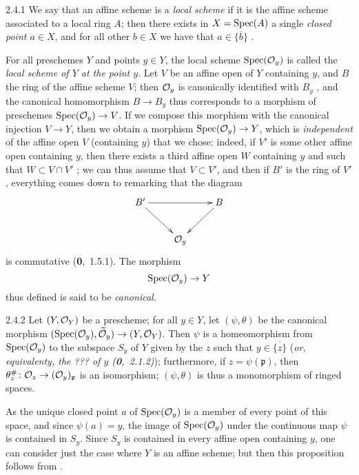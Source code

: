 
\begin{env}{2.4.1}
\label{env-1.2.4.1}
We say that an affine scheme is a \emph{local scheme} if
it is the affine scheme associated to a local ring $A$; then there exists in
$X=\operatorname{Spec}(A)$ a single \emph{closed point $a\in X$}, and for all other $b\in X$
we have that $a\in\overline{\{b\}}$ .
\end{env}
    
For all preschemes $Y$ and points $y\in Y$, the local scheme $\operatorname{Spec}(\mathcal{O}_y)$
is called the \emph{local scheme of $Y$ at the point $y$}. Let $V$ be an affine
open of $Y$ containing $y$, and $B$ the ring of the affine scheme $V$; then
$\mathcal{O}_y$ is canonically identified with $B_y$ , and the canonical
homomorphism $B\to B_y$ thus corresponds  to a morphism of preschemes
$\operatorname{Spec}(\mathcal{O}_y)\to V$.  If we compose this morphism with the canonical injection
$V\to Y$, then we obtain a morphism $\operatorname{Spec}(\mathcal{O}_y)\to Y$, which is
\emph{independent} of the affine open $V$ (containing $y$) that we chose:
indeed, if $V'$ is some other affine open containing $y$, then there exists a
third affine open $W$ containing $y$ and such that $W\subset V\cap V'$ ;
we can thus assume that $V\subset V'$, and then if $B'$ is the ring of $V'$,
everything comes down to remarking that the diagram
\[
  \xymatrix{
    B'\ar[rr]\ar[dr] & & B\ar[dl]\\
    & \O_y &
  }
\]
is commutative
(\textbf{0},~1.5.1). The morphism \[ \operatorname{Spec}(\mathcal{O}_y)\to Y \] thus defined is said
to be \emph{canonical}.
    
\begin{env}[Proposition]{2.4.2}
\label{prop-1.2.4.2}
Let $(Y,\mathcal{O}_Y)$ be a prescheme;
for all $y\in Y$, let $(\psi,\theta)$ be the canonical morphism
$(\operatorname{Spec}(\mathcal{O}_y),\widetilde{\mathcal{O}}_y)\to(Y,\mathcal{O}_Y)$. Then $\psi$ is a homeomorphism
from $\operatorname{Spec}(\mathcal{O}_y)$ to the subspace $S_y$ of $Y$ given by the $z$ such that
$y\in\overline{\{z\}}$ (\emph{or, equivalenty, the \emph{???} of $y$
(\textbf{0},~2.1.2)}); furthermore, if $z=\psi(\mathfrak{p})$, then
$\theta_z^\#\colon\mathcal{O}_z\to(\mathcal{O}_y)_\mathfrak{p}$ is an isomorphism; $(\psi,\theta)$
is thus a monomorphism of ringed spaces.
\end{env}
    
As the unique closed point $a$ of $\operatorname{Spec}(\mathcal{O}_y)$ {is a member of every
point of this space}, and since $\psi(a)=y$, the image of $\operatorname{Spec}(\mathcal{O}_y)$ under
the continuous map $\psi$ is contained in $S_y$. Since $S_y$ is contained in
every affine open containing $y$, one can consider just the case where $Y$ is an
affine scheme; but then this proposition follows from .
    
